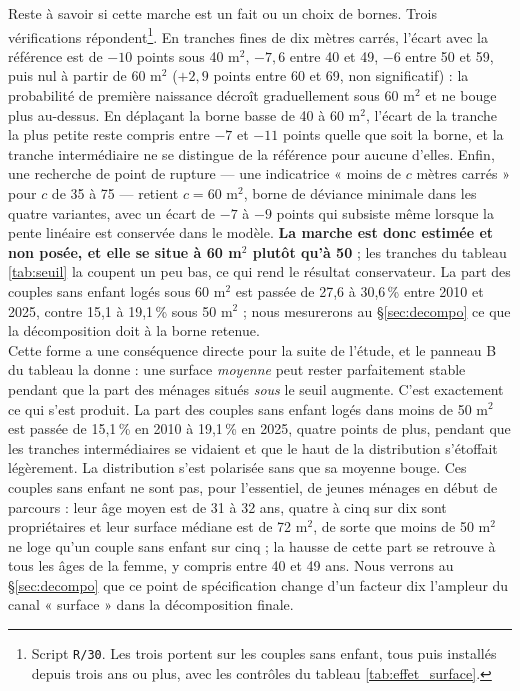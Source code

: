 \documentclass[12pt,a4paper]{article}
\begin{document}
\noindent Reste à savoir si cette marche est un fait ou un choix de bornes. Trois vérifications répondent\footnote{Script \texttt{R/30}. Les trois portent sur les couples sans enfant, tous puis installés depuis trois ans ou plus, avec les contrôles du tableau \ref{tab:effet_surface}.}. En tranches fines de dix mètres carrés, l'écart avec la référence est de $-10$ points sous 40 m$^2$, $-7{,}6$ entre 40 et 49, $-6$ entre 50 et 59, puis nul à partir de 60 m$^2$ ($+2{,}9$ points entre 60 et 69, non significatif) : la probabilité de première naissance décroît graduellement sous 60 m$^2$ et ne bouge plus au-dessus. En déplaçant la borne basse de 40 à 60 m$^2$, l'écart de la tranche la plus petite reste compris entre $-7$ et $-11$ points quelle que soit la borne, et la tranche intermédiaire ne se distingue de la référence pour aucune d'elles. Enfin, une recherche de point de rupture — une indicatrice « moins de $c$ mètres carrés » pour $c$ de 35 à 75 — retient $c = 60$ m$^2$, borne de déviance minimale dans les quatre variantes, avec un écart de $-7$ à $-9$ points qui subsiste même lorsque la pente linéaire est conservée dans le modèle. \textbf{La marche est donc estimée et non posée, et elle se situe à 60 m$^2$ plutôt qu'à 50} ; les tranches du tableau \ref{tab:seuil} la coupent un peu bas, ce qui rend le résultat conservateur. La part des couples sans enfant logés sous 60 m$^2$ est passée de 27,6 à 30,6\,\% entre 2010 et 2025, contre 15,1 à 19,1\,\% sous 50 m$^2$ ; nous mesurerons au §\ref{sec:decompo} ce que la décomposition doit à la borne retenue. \\

\noindent Cette forme a une conséquence directe pour la suite de l'étude, et le panneau B du tableau la donne : une surface \textit{moyenne} peut rester parfaitement stable pendant que la part des ménages situés \textit{sous} le seuil augmente. C'est exactement ce qui s'est produit. La part des couples sans enfant logés dans moins de 50 m$^2$ est passée de 15,1\,\% en 2010 à 19,1\,\% en 2025, quatre points de plus, pendant que les tranches intermédiaires se vidaient et que le haut de la distribution s'étoffait légèrement. La distribution s'est polarisée sans que sa moyenne bouge. Ces couples sans enfant ne sont pas, pour l'essentiel, de jeunes ménages en début de parcours : leur âge moyen est de 31 à 32 ans, quatre à cinq sur dix sont propriétaires et leur surface médiane est de 72 m$^2$, de sorte que moins de 50 m$^2$ ne loge qu'un couple sans enfant sur cinq ; la hausse de cette part se retrouve à tous les âges de la femme, y compris entre 40 et 49 ans. Nous verrons au §\ref{sec:decompo} que ce point de spécification change d'un facteur dix l'ampleur du canal « surface » dans la décomposition finale. \\
\end{document}
